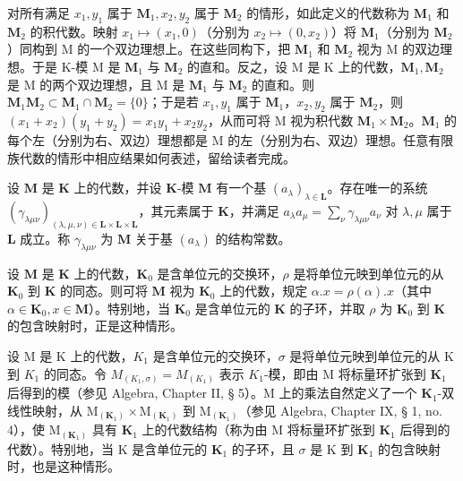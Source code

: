 对所有满足 \(x_1, y_1\) 属于 \(\mathbf{M}_1, x_2, y_2\) 属于 \(\mathbf{M}_2\) 的情形，如此定义的代数称为 \(\mathbf{M}_1\) 和 \(\mathbf{M}_2\) 的积代数。映射 \(x_1 \mapsto (x_1, 0)\)（分别为 \(x_2 \mapsto (0, x_2)\)）将 \(\mathbf{M}_1\)（分别为 \(\mathbf{M}_2\)）同构到 M 的一个双边理想上。在这些同构下，把 \(\mathbf{M}_1\) 和 \(\mathbf{M}_2\) 视为 M 的双边理想。于是 K-模 M 是 \(\mathbf{M}_1\) 与 \(\mathbf{M}_2\) 的直和。反之，设 M 是 K 上的代数，\(\mathbf{M}_1, \mathbf{M}_2\) 是 M 的两个双边理想，且 M 是 \(\mathbf{M}_1\) 与 \(\mathbf{M}_2\) 的直和。则 \(\mathbf{M}_1\mathbf{M}_2 \subset \mathbf{M}_1 \cap \mathbf{M}_2 = \{0\}\)；于是若 \(x_1, y_1\) 属于 \(\mathbf{M}_1\)，\(x_2, y_2\) 属于 \(\mathbf{M}_2\)，则 \((x_1 + x_2)(y_1 + y_2) = x_1y_1 + x_2y_2\)，从而可将 M 视为积代数 \(\mathbf{M}_1 \times \mathbf{M}_2\)。\(\mathbf{M}_1\) 的每个左（分别为右、双边）理想都是 M 的左（分别为右、双边）理想。任意有限族代数的情形中相应结果如何表述，留给读者完成。

设 \(\mathbf{M}\) 是 \(\mathbf{K}\) 上的代数，并设 \(\mathbf{K}\)-模 \(\mathbf{M}\) 有一个基 \((a_{\lambda})_{\lambda \in \mathbf{L}}\)。存在唯一的系统 \((\gamma_{\lambda \mu \nu})_{(\lambda, \mu, \nu) \in \mathbf{L} \times \mathbf{L} \times \mathbf{L}}\)，其元素属于 \(\mathbf{K}\)，并满足 \(a_{\lambda}a_{\mu} = \sum_{\nu} \gamma_{\lambda \mu \nu}a_{\nu}\) 对 \(\lambda, \mu\) 属于 \(\mathbf{L}\) 成立。称 \(\gamma_{\lambda \mu \nu}\) 为 \(\mathbf{M}\) 关于基 \((a_{\lambda})\) 的结构常数。

设 \(\mathbf{M}\) 是 \(\mathbf{K}\) 上的代数，\(\mathbf{K}_0\) 是含单位元的交换环，\(\rho\) 是将单位元映到单位元的从 \(\mathbf{K}_0\) 到 \(\mathbf{K}\) 的同态。则可将 \(\mathbf{M}\) 视为 \(\mathbf{K}_0\) 上的代数，规定 \(\alpha.x = \rho(\alpha).x\)（其中 \(\alpha \in \mathbf{K}_0, x \in \mathbf{M}\)）。特别地，当 \(\mathbf{K}_0\) 是含单位元的 \(\mathbf{K}\) 的子环，并取 \(\rho\) 为 \(\mathbf{K}_0\) 到 \(\mathbf{K}\) 的包含映射时，正是这种情形。

设 M 是 K 上的代数，\(K_{1}\) 是含单位元的交换环，\(\sigma\) 是将单位元映到单位元的从 K 到 \(K_{1}\) 的同态。令 \(M_{(K_{1},\sigma)} = M_{(K_{1})}\) 表示 \(K_{1}\)-模，即由 M 将标量环扩张到 \(\mathbf{K}_1\) 后得到的模（参见 Algebra, Chapter II, § 5）。M 上的乘法自然定义了一个 \(\mathbf{K}_1\)-双线性映射，从 \(\mathrm{M}_{(\mathbf{K}_1)} \times \mathrm{M}_{(\mathbf{K}_1)}\) 到 \(\mathrm{M}_{(\mathbf{K}_1)}\)（参见 Algebra, Chapter IX, § 1, no. 4），使 \(\mathrm{M}_{(\mathbf{K}_1)}\) 具有 \(\mathbf{K}_1\) 上的代数结构（称为由 M 将标量环扩张到 \(\mathbf{K}_1\) 后得到的代数）。特别地，当 K 是含单位元的 \(\mathbf{K}_1\) 的子环，且 \(\sigma\) 是 K 到 \(\mathbf{K}_1\) 的包含映射时，也是这种情形。

